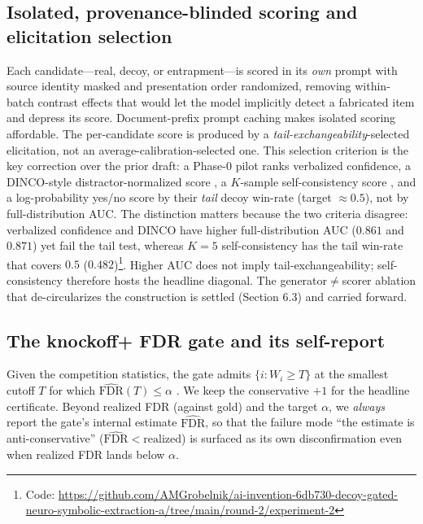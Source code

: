 \documentclass[11pt,letterpaper]{article}
\begin{document}
\subsection{Isolated, provenance-blinded scoring and elicitation selection}

Each candidate---real, decoy, or entrapment---is scored in its \emph{own} prompt with source identity masked and presentation order randomized, removing within-batch contrast effects that would let the model implicitly detect a fabricated item and depress its score. Document-prefix prompt caching makes isolated scoring affordable. The per-candidate score is produced by a \emph{tail-exchangeability}-selected elicitation, not an average-calibration-selected one. This selection criterion is the key correction over the prior draft: a Phase-0 pilot ranks verbalized confidence, a DINCO-style distractor-normalized score \cite{Wang2025}, a $K$-sample self-consistency score \cite{Manakul2023, Sawczyn2025}, and a log-probability yes/no score by their \emph{tail} decoy win-rate (target $\approx 0.5$), not by full-distribution AUC. The distinction matters because the two criteria disagree: verbalized confidence and DINCO have higher full-distribution AUC ($0.861$ and $0.871$) yet fail the tail test, whereas $K{=}5$ self-consistency has the tail win-rate that covers $0.5$ ($0.482$)\footnote{Code: \url{https://github.com/AMGrobelnik/ai-invention-6db730-decoy-gated-neuro-symbolic-extraction-a/tree/main/round-2/experiment-2}}. Higher AUC does not imply tail-exchangeability; self-consistency therefore hosts the headline diagonal. The generator$\neq$scorer ablation that de-circularizes the construction is settled (Section 6.3) and carried forward.

\subsection{The knockoff+ FDR gate and its self-report}

Given the competition statistics, the gate admits $\{i : W_i \ge T\}$ at the smallest cutoff $T$ for which $\widehat{\mathrm{FDR}}(T) \le \alpha$ \cite{Barber2015}. We keep the conservative $+1$ for the headline certificate. Beyond realized FDR (against gold) and the target $\alpha$, we \emph{always} report the gate's internal estimate $\widehat{\mathrm{FDR}}$, so that the failure mode ``the estimate is anti-conservative'' ($\widehat{\mathrm{FDR}} < \text{realized}$) is surfaced as its own disconfirmation even when realized FDR lands below $\alpha$.
\end{document}
